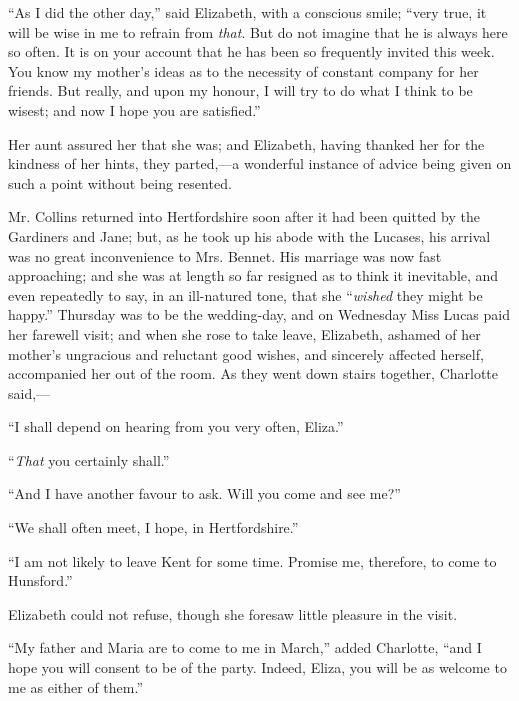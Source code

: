 ``As I did the other day,'' said Elizabeth, with a conscious smile; ``very true, it will be wise in me to refrain from \textit{that}. But do not imagine that he is always here so often. It is on your account that he has been so frequently invited this week. You know my mother's ideas as to the necessity of constant company for her friends. But really, and upon my honour, I will try to do what I think to be wisest; and now I hope you are satisfied.''

Her aunt assured her that she was; and Elizabeth, having thanked her for the kindness of her hints, they parted,---a wonderful instance of advice being given on such a point without being resented.

Mr. Collins returned into Hertfordshire soon after it had been quitted by the Gardiners and Jane; but, as he took up his abode with the Lucases, his arrival was no great inconvenience to Mrs. Bennet. His marriage was now fast approaching; and she was at length so far resigned as to think it inevitable, and even repeatedly to say, in an ill-natured tone, that she ``\textit{wished} they might be happy.'' Thursday was to be the wedding-day, and on Wednesday Miss Lucas paid her farewell visit; and when she rose to take leave, Elizabeth, ashamed of her mother's ungracious and reluctant good wishes, and sincerely affected herself, accompanied her out of the room. As they went down stairs together, Charlotte said,---

``I shall depend on hearing from you very often, Eliza.''

``\textit{That} you certainly shall.''

``And I have another favour to ask. Will you come and see me?''

``We shall often meet, I hope, in Hertfordshire.''

``I am not likely to leave Kent for some time. Promise me, therefore, to come to Hunsford.''

Elizabeth could not refuse, though she foresaw little pleasure in the visit.

``My father and Maria are to come to me in March,'' added Charlotte, ``and I hope you will consent to be of the party. Indeed, Eliza, you will be as welcome to me as either of them.''

